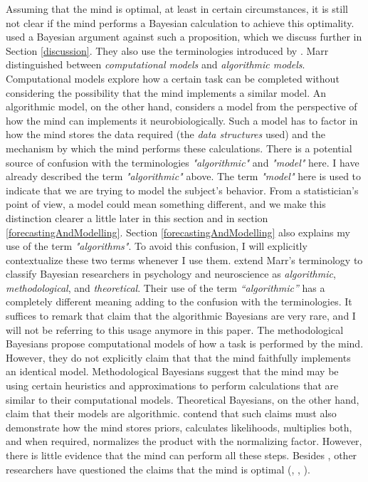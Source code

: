 \documentclass{article}
\begin{document}
Assuming that the mind is optimal, at least in certain circumstances, it is still not clear if the mind performs a Bayesian calculation to achieve this optimality. \cite{Bowers2012BayesianJS} used a Bayesian argument against such a proposition, which we discuss further in Section \ref{discussion}. They also use the terminologies introduced by \cite{marr1982vision}. Marr distinguished between \textit{computational models} and \textit{algorithmic models}. Computational models explore how a certain task can be completed without considering the possibility that the mind implements a similar model. An algorithmic model, on the other hand, considers a model from the perspective of how the mind can implements it neurobiologically. Such a model has to factor in how the mind stores the data required (the \textit{data structures} used) and the mechanism by which the mind performs these calculations. There is a potential source of confusion with the terminologies \textit{"algorithmic"} and \textit{"model"} here. I have already described the term \textit{"algorithmic"} above. The term \textit{"model"} here is used to indicate that we are trying to model the subject's behavior. From a statistician's point of view, a model could mean something different, and we make this distinction clearer a little later in this section and in section \ref{forecastingAndModelling}. Section \ref{forecastingAndModelling} also explains my use of the term \textit{"algorithms"}. To avoid this confusion, I will explicitly contextualize these two terms whenever I use them. \cite{Bowers2012BayesianJS} extend Marr's terminology to classify Bayesian researchers in psychology and neuroscience as \textit{algorithmic}, \textit{methodological}, and \textit{theoretical}. Their use of the term \textit{``algorithmic''} has a completely different meaning adding to the confusion with the terminologies. It suffices to remark that \cite{Bowers2012BayesianJS} claim that the algorithmic Bayesians are very rare, and I will not be referring to this usage anymore in this paper. The methodological Bayesians propose computational models of how a task is performed by the mind. However, they do not explicitly claim that that the mind faithfully implements an identical model. Methodological Bayesians suggest that the mind may be using certain heuristics and approximations to perform calculations that are similar to their computational models. Theoretical Bayesians, on the other hand, claim that their models are algorithmic. \cite{Bowers2012BayesianJS} contend that such claims must also demonstrate how the mind stores priors, calculates likelihoods, multiplies both, and when required, normalizes the product with the normalizing factor. However, there is little evidence that the mind can perform all these steps. Besides \cite{Bowers2012BayesianJS}, other researchers have questioned the claims that the mind is optimal (\cite{pittphilsci14767}, \cite{Tauber2017BayesianMO}, \cite{elqayam2011subtracting}).
\end{document}
